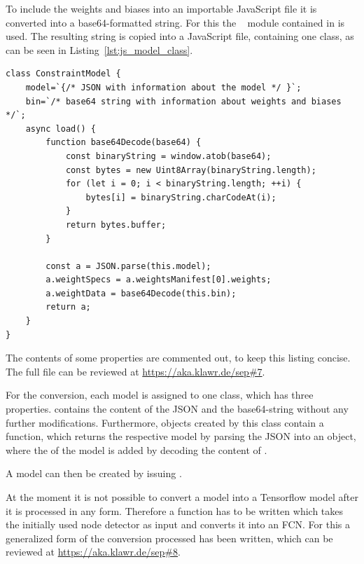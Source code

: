 To include the weights and biases into an importable JavaScript file it is converted into a base64-formatted string.
For this the ~\cite{Josefsson2018} module contained in  is used.
The resulting string is copied into a JavaScript file, containing one class, as can be seen in Listing~\ref{lst:js_model_class}.

\begin{lstlisting}[label={lst:js_model_class}, caption={[JavaScript classes for Tensorflow.js.] Class definition of one of the models providing necessary functions to be used by \code{tf.loadLayersModel} to return a usable model in JavaScript. }]
class ConstraintModel {
    model=`{/* JSON with information about the model */ }`;
    bin=`/* base64 string with information about weights and biases */`;
    async load() {
        function base64Decode(base64) {
            const binaryString = window.atob(base64);
            const bytes = new Uint8Array(binaryString.length);
            for (let i = 0; i < binaryString.length; ++i) {
                bytes[i] = binaryString.charCodeAt(i);
            }
            return bytes.buffer;
        }
    
        const a = JSON.parse(this.model);
        a.weightSpecs = a.weightsManifest[0].weights;
        a.weightData = base64Decode(this.bin);
        return a;
    }
}
\end{lstlisting}

The contents of some properties are commented out, to keep this listing concise.
The full file can be reviewed at \url{https://aka.klawr.de/sep\#7}. %

For the conversion, each model is assigned to one class, which has three properties.
 contains the content of the JSON and  the base64-string without any further modifications.
Furthermore, objects created by this class contain a  function, which returns the respective model by parsing the JSON into an object, where the  of the model is added by decoding the content of .

A model can then be created by issuing .

At the moment it is not possible to convert a model into a Tensorflow model after it is processed in any form.
Therefore a function has to be written which takes the initially used node detector as input and converts it into an FCN.\@
For this a generalized form of the conversion processed has been written, which can be reviewed at \url{https://aka.klawr.de/sep\#8}. %

